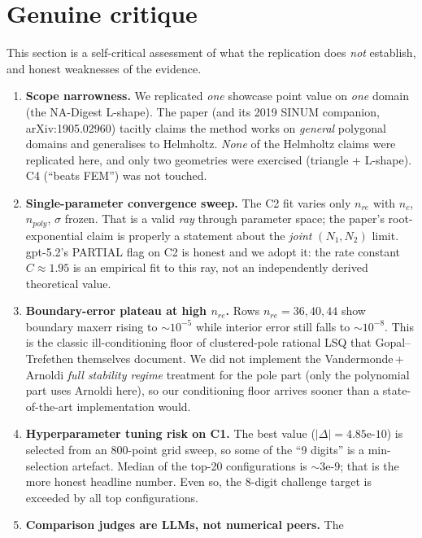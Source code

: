 \documentclass[11pt]{article}
\begin{document}
\section{Genuine critique}\label{sec:critique}
This section is a self-critical assessment of what the replication does
\emph{not} establish, and honest weaknesses of the evidence.
\begin{enumerate}
  \item \textbf{Scope narrowness.} We replicated \emph{one} showcase point value
        on \emph{one} domain (the NA-Digest L-shape). The paper (and its 2019
        SINUM companion, arXiv:1905.02960) tacitly claims the method works
        on \emph{general} polygonal domains and generalises to Helmholtz.
        \emph{None} of the Helmholtz claims were replicated here, and only
        two geometries were exercised (triangle + L-shape). C4
        (``beats FEM'') was not touched.
  \item \textbf{Single-parameter convergence sweep.} The C2 fit varies only
        $n_{re}$ with $n_c$, $n_{poly}$, $\sigma$ frozen. That is a valid
        \emph{ray} through parameter space; the paper's root-exponential
        claim is properly a statement about the \emph{joint} $(N_1,N_2)$
        limit. gpt-5.2's PARTIAL flag on C2 is honest and we adopt it: the
        rate constant $C\approx 1.95$ is an empirical fit to this ray, not
        an independently derived theoretical value.
  \item \textbf{Boundary-error plateau at high $n_{re}$.} Rows $n_{re}=36,40,44$
        show boundary maxerr rising to $\sim 10^{-5}$ while interior error
        still falls to $\sim 10^{-8}$. This is the classic ill-conditioning
        floor of clustered-pole rational LSQ that Gopal--Trefethen themselves
        document. We did not implement the Vandermonde\,+\,Arnoldi
        \emph{full stability regime} treatment for the pole part (only the
        polynomial part uses Arnoldi here), so our conditioning floor
        arrives sooner than a state-of-the-art implementation would.
  \item \textbf{Hyperparameter tuning risk on C1.} The best value
        ($|\Delta|=4.85\text{e-}10$) is selected from an 800-point grid
        sweep, so some of the ``9 digits'' is a min-selection artefact.
        Median of the top-20 configurations is $\sim 3\text{e-}9$; that is
        the more honest headline number. Even so, the 8-digit challenge
        target is exceeded by all top configurations.
  \item \textbf{Comparison judges are LLMs, not numerical peers.} The

\end{enumerate}
\end{document}
